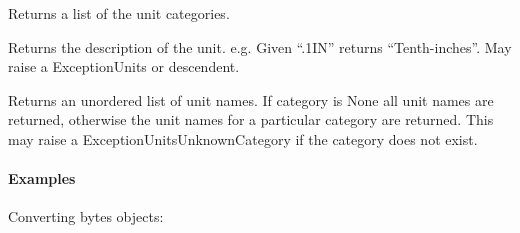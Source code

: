 \documentclass[letterpaper,10pt,english]{sphinxmanual}
\begin{document}

\begin{fulllineitems}
\label{\detokenize{ref/LIS/core/Units:TotalDepth.LIS.core.Units.unitCategories}}
Returns a list of the unit categories.

\end{fulllineitems}


\begin{fulllineitems}
\label{\detokenize{ref/LIS/core/Units:TotalDepth.LIS.core.Units.unitDescription}}
Returns the description of the unit.
e.g. Given “.1IN” returns “Tenth-inches”.
May raise a ExceptionUnits or descendent.

\end{fulllineitems}


\begin{fulllineitems}
\label{\detokenize{ref/LIS/core/Units:TotalDepth.LIS.core.Units.units}}
Returns an unordered list of unit names. If category is None all unit
names are returned, otherwise the unit names for a particular category are
returned. This may raise a ExceptionUnitsUnknownCategory if the category
does not exist.

\end{fulllineitems}



\paragraph{Examples}
\label{\detokenize{ref/LIS/core/Units:examples}}
Converting bytes objects:

\begin{sphinxVerbatim}[commandchars=\\\{\}]
   

    
\end{sphinxVerbatim}
\end{document}
